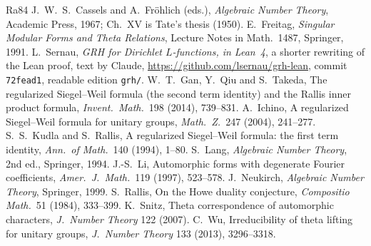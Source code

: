 \documentclass[reqno]{amsart}
\theoremstyle{definition}
\theoremstyle{plain}
\begin{document}
\begin{thebibliography}{Ra84}
 J.~W.~S.~Cassels and A.~Fr\"ohlich (eds.), \emph{Algebraic Number Theory}, Academic Press, 1967; Ch.~XV is Tate's thesis (1950).
 E.~Freitag, \emph{Singular Modular Forms and Theta Relations}, Lecture Notes in Math.\ 1487, Springer, 1991.
 L.~Sernau, \emph{GRH for Dirichlet \(L\)-functions, in Lean~4}, a shorter rewriting of the Lean proof, text by Claude, \url{https://github.com/lsernau/grh-lean}, commit \texttt{72fead1}, readable edition \texttt{grh/}.
 W.~T.~Gan, Y.~Qiu and S.~Takeda, The regularized Siegel--Weil formula (the second term identity) and the Rallis inner product formula, \emph{Invent.\ Math.}\ 198 (2014), 739--831.
 A.~Ichino, A regularized Siegel--Weil formula for unitary groups, \emph{Math.\ Z.}\ 247 (2004), 241--277.
 S.~S.~Kudla and S.~Rallis, A regularized Siegel--Weil formula: the first term identity, \emph{Ann.\ of Math.}\ 140 (1994), 1--80.
 S.~Lang, \emph{Algebraic Number Theory}, 2nd ed., Springer, 1994.
 J.-S.~Li, Automorphic forms with degenerate Fourier coefficients, \emph{Amer.\ J.\ Math.}\ 119 (1997), 523--578.
 J.~Neukirch, \emph{Algebraic Number Theory}, Springer, 1999.
 S.~Rallis, On the Howe duality conjecture, \emph{Compositio Math.}\ 51 (1984), 333--399.
 K.~Snitz, Theta correspondence of automorphic characters, \emph{J.\ Number Theory} 122 (2007).
 C.~Wu, Irreducibility of theta lifting for unitary groups, \emph{J.\ Number Theory} 133 (2013), 3296--3318.
\end{thebibliography}
\end{document}
